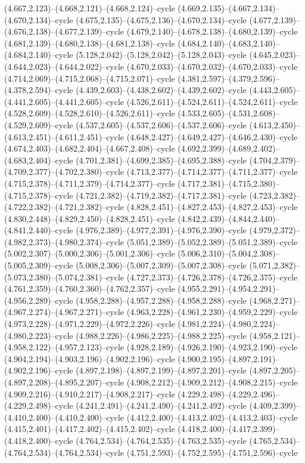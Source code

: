 (4.667,2.123)--(4.668,2.121)--(4.668,2.124)--cycle (4.669,2.135)--(4.667,2.134)--(4.670,2.134)--cycle (4.675,2.135)--(4.675,2.136)--(4.670,2.134)--cycle (4.677,2.139)--(4.676,2.138)--(4.677,2.139)--cycle (4.679,2.140)--(4.678,2.138)--(4.680,2.139)--cycle (4.681,2.139)--(4.680,2.138)--(4.681,2.138)--cycle (4.684,2.140)--(4.683,2.140)--(4.684,2.140)--cycle (5.128,2.042)--(5.128,2.042)--(5.128,2.043)--cycle (4.645,2.023)--(4.644,2.023)--(4.644,2.022)--cycle (4.670,2.033)--(4.670,2.032)--(4.670,2.033)--cycle (4.714,2.069)--(4.715,2.068)--(4.715,2.071)--cycle (4.381,2.597)--(4.379,2.596)--(4.378,2.594)--cycle (4.439,2.603)--(4.438,2.602)--(4.439,2.602)--cycle (4.443,2.605)--(4.441,2.605)--(4.441,2.605)--cycle (4.526,2.611)--(4.524,2.611)--(4.524,2.611)--cycle (4.528,2.609)--(4.528,2.610)--(4.526,2.611)--cycle (4.533,2.605)--(4.531,2.608)--(4.529,2.609)--cycle (4.537,2.605)--(4.537,2.606)--(4.537,2.606)--cycle (4.613,2.450)--(4.613,2.451)--(4.611,2.451)--cycle (4.648,2.427)--(4.649,2.427)--(4.646,2.430)--cycle (4.674,2.403)--(4.682,2.404)--(4.667,2.408)--cycle (4.692,2.399)--(4.689,2.402)--(4.683,2.404)--cycle (4.701,2.381)--(4.699,2.385)--(4.695,2.388)--cycle (4.704,2.379)--(4.709,2.377)--(4.702,2.380)--cycle (4.713,2.377)--(4.714,2.377)--(4.711,2.377)--cycle (4.715,2.378)--(4.711,2.379)--(4.714,2.377)--cycle (4.717,2.381)--(4.715,2.380)--(4.715,2.378)--cycle (4.721,2.382)--(4.719,2.382)--(4.717,2.381)--cycle (4.723,2.382)--(4.722,2.382)--(4.721,2.382)--cycle (4.828,2.451)--(4.827,2.453)--(4.827,2.453)--cycle (4.830,2.448)--(4.829,2.450)--(4.828,2.451)--cycle (4.842,2.439)--(4.844,2.440)--(4.841,2.440)--cycle (4.976,2.389)--(4.977,2.391)--(4.976,2.390)--cycle (4.979,2.372)--(4.982,2.373)--(4.980,2.374)--cycle (5.051,2.389)--(5.052,2.389)--(5.051,2.389)--cycle (5.002,2.307)--(5.000,2.306)--(5.001,2.306)--cycle (5.006,2.310)--(5.004,2.308)--(5.005,2.309)--cycle (5.008,2.306)--(5.007,2.309)--(5.007,2.308)--cycle (5.071,2.382)--(5.073,2.380)--(5.074,2.381)--cycle (4.727,2.373)--(4.726,2.378)--(4.726,2.375)--cycle (4.761,2.359)--(4.760,2.360)--(4.762,2.357)--cycle (4.955,2.291)--(4.954,2.291)--(4.956,2.289)--cycle (4.958,2.288)--(4.957,2.288)--(4.958,2.288)--cycle (4.968,2.271)--(4.967,2.274)--(4.967,2.271)--cycle (4.963,2.228)--(4.961,2.230)--(4.959,2.229)--cycle (4.973,2.228)--(4.971,2.229)--(4.972,2.226)--cycle (4.981,2.224)--(4.980,2.224)--(4.980,2.223)--cycle (4.988,2.226)--(4.986,2.225)--(4.988,2.225)--cycle (4.958,2.121)--(4.958,2.122)--(4.957,2.123)--cycle (4.928,2.189)--(4.926,2.190)--(4.923,2.190)--cycle (4.904,2.194)--(4.903,2.196)--(4.902,2.196)--cycle (4.900,2.195)--(4.897,2.191)--(4.902,2.196)--cycle (4.897,2.198)--(4.897,2.199)--(4.897,2.201)--cycle (4.897,2.205)--(4.897,2.208)--(4.895,2.207)--cycle (4.908,2.212)--(4.909,2.212)--(4.908,2.215)--cycle (4.909,2.216)--(4.910,2.217)--(4.908,2.217)--cycle (4.229,2.498)--(4.229,2.496)--(4.229,2.498)--cycle (4.241,2.491)--(4.241,2.490)--(4.241,2.492)--cycle (4.409,2.399)--(4.410,2.400)--(4.410,2.400)--cycle (4.412,2.400)--(4.413,2.402)--(4.413,2.403)--cycle (4.415,2.401)--(4.417,2.402)--(4.415,2.402)--cycle (4.418,2.400)--(4.417,2.399)--(4.418,2.400)--cycle (4.764,2.534)--(4.764,2.535)--(4.763,2.535)--cycle (4.765,2.534)--(4.764,2.534)--(4.764,2.534)--cycle (4.751,2.593)--(4.752,2.595)--(4.751,2.596)--cycle 